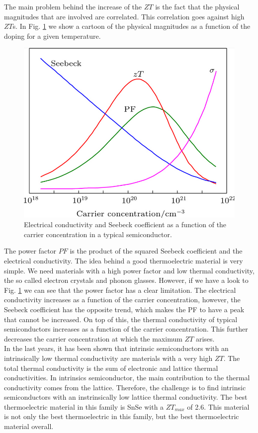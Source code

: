The main problem behind the increase of the $ZT$ is the fact that the physical magnitudes that are involved are 
correlated. This correlation goes against high $ZT$s. In Fig. \ref{decouple} we show a cartoon of the physical 
magnitudes as a function of the doping for a given temperature.
\begin{figure}[h]
\begin{center}
\includegraphics[width=0.9\linewidth]{Figures/decoupling.png}
\caption[Thermoelectric physical magnitudes]{Electrical conductivity and  Seebeck coefficient as a function of the 
carrier concentration in a typical semiconductor.}
\label{decouple}
\end{center}
\end{figure}
The power factor $PF$ is the product of the squared Seebeck coefficient and the electrical conductivity. The idea 
behind a good thermoelectric material is very simple. We need materials with a high power factor and low thermal 
conductivity, the so called electron crystals and phonon glasses. However, if we have a look to Fig. \ref{decouple}
we can see that the power factor has a clear limitation. The electrical conductivity increases as a function of the 
carrier concentration, however, the Seebeck coefficient has the opposite trend, which makes the PF to have a peak 
that cannot be increased. On top of this, the thermal conductivity of typical semiconductors increases as a 
function of the carrier concentration. This further decreases the carrier concentration at which the maximum $ZT$ 
arises. \\

In the last years, it has been shown that intrinsic semiconductors with an intrinsically low thermal conductivity 
are materials with a very high $ZT$. The total thermal conductivity is the sum of electronic and lattice thermal 
conductivities. In intrinsics semiconductor, the main contribution to the thermal conductivity comes from the 
lattice. Therefore, the challenge is to find intrinsic semiconductors with an instrinsically low lattice thermal 
conductivity. The best thermoelectric material in this family is SnSe with a $ZT_{max}$ of 2.6. This material is 
not only the best thermoelectric in this family, but the best thermoelectric material overall. \\

